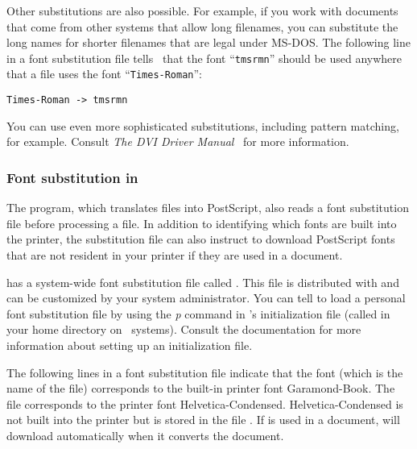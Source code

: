 Other substitutions are also possible.  For example, if you 
work with documents that come from other systems that    allow long
filenames, you can substitute the long names for shorter filenames
that are legal under MS-DOS.  The following line in a font substitution
file tells \emTeX\ that the font ``{\tt tmsrmn}'' should be used anywhere
that a  file uses the font ``{\tt Times-Roman}'':

\begin{exindent}
  \verb|Times-Roman -> tmsrmn|
\end{exindent}

You can use even more sophisticated substitutions, including pattern matching, 
for example.  Consult {\it The {\emTeX} DVI Driver Manual}~\cite{em:dvidrv} 
for more information.

\subsubsection{Font substitution in \protect\dvips}

The  program, 
which translates  files into
PostScript, also reads a font substitution file before processing a
 file.  In addition to identifying which fonts are built into the
printer, the substitution file can also instruct  to 
download PostScript fonts that are not resident in your printer 
if they are used in a document.

 has a system-wide font substitution file called
.  This file 
is distributed with 
and can be customized by your system administrator.  You can tell
 to load a personal font substitution file by
using the \textit{p} command in 's initialization
file (called  in your home directory on \Unix\ systems).
Consult the  documentation for more information
about setting up an initialization file.

The following lines in a font substitution file indicate that the font
 (which is the name of the  file) corresponds
to the built-in printer font Garamond-Book.
The  file  corresponds to the
printer font Helvetica-Condensed.  Helvetica-Condensed is
not built into the printer but is stored in the file
.  If  is used in
a document,  will download  automatically
when it converts the document.

